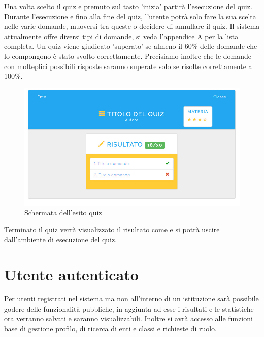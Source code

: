 \documentclass[a4paper, titlepage]{article}
\begin{document}
	 Una volta scelto il quiz e premuto sul tasto 'inizia' partirà l'esecuzione del quiz. Durante l'esecuzione e fino alla fine del quiz, l'utente potrà solo fare la sua scelta nelle varie domande, muoversi tra queste o decidere di annullare il quiz. Il sistema attualmente offre diversi tipi di domande, si veda l'\hyperref[domande]{appendice A} per la lista completa. Un quiz viene giudicato 'superato' se almeno il 60\% delle domande che lo compongono è stato svolto correttamente. Precisiamo inoltre che le domande con molteplici possibili risposte saranno superate solo se risolte correttamente al 100\%.
	 
	 \newpage
	 \begin{figure}[!h]
	 	\centering
	 	\includegraphics[scale=0.33]{Img/screen_EsitoQuiz.png}
	 	\caption{Schermata dell'esito quiz}
	 \end{figure}
	 Terminato il quiz verrà visualizzato il risultato come
	  e si potrà uscire dall'ambiente di esecuzione del quiz.
	 
	 \newpage
	 \section{Utente autenticato}
	 Per utenti registrati nel sistema ma non all'interno di un istituzione sarà possibile godere delle funzionalità pubbliche, in aggiunta ad esse i risultati e le statistiche ora verranno salvati e saranno visualizzabili. Inoltre si avrà accesso alle funzioni base di gestione profilo, di ricerca di enti e classi e richieste di ruolo.
\end{document}
